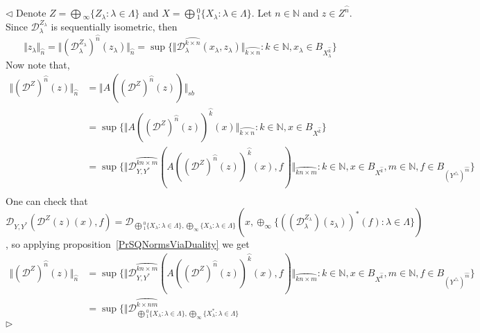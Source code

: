 \documentclass[12pt]{article}
\newenvironment{proof}{\par $\triangleleft$}{$\triangleright$}
\begin{document}
\begin{proof} Denote $Z=\bigoplus{}_\infty \{Z_\lambda:\lambda\in\Lambda \}$ and 
$X=\bigoplus{}_1^0 \{X_\lambda:\lambda\in\Lambda \}$. Let $n\in\mathbb{N}$ and 
$z\in Z^{\wideparen{n}}$. Since $\mathcal{D}_\lambda^{Z_\lambda}$ is 
sequentially isometric, then
$$
\Vert z_\lambda\Vert_{\wideparen{n}}=
\Vert
    {(\mathcal{D}_\lambda^{Z_\lambda})}^{\wideparen{n}}(z_\lambda)
\Vert_{\wideparen{n}}
=\sup \{
    \Vert 
        \mathcal{D}_\lambda^{\wideparen{k\times n}}(x_\lambda,z_\lambda)
    \Vert_{\wideparen{k\times n}}
    :k\in\mathbb{N},x_\lambda\in B_{X_\lambda^{\wideparen{k}}}
 \}
$$
Now note that,
$$
\begin{aligned}
\Vert{(\mathcal{D}^Z)}^{\wideparen{n}}(z)\Vert_{\wideparen{n}} &
=\Vert  
    A({(\mathcal{D}^Z)}^{\wideparen{n}}(z))
\Vert_{sb}\\
&=\sup \{
    \Vert
        {A({(\mathcal{D}^Z)}^{\wideparen{n}}(z))}^{\wideparen{k}}(x)
    \Vert_{\wideparen{k\times n}}
    :k\in\mathbb{N},x\in B_{X^{\wideparen{k}}}
 \} \\
&=\sup \{
    \Vert 
        \mathcal{D}_{Y,Y^*}^{\wideparen{kn\times m}}(
            {A({(\mathcal{D}^Z)}^{\wideparen{n}}(z))}^{\wideparen{k}}(x),f
        )
    \Vert_{\wideparen{kn\times m}}
    :k\in\mathbb{N},x\in B_{X^{\wideparen{k}}},m\in\mathbb{N},
    f\in B_{{(Y^\triangle)}^{\wideparen{m}}}
 \} \\
\end{aligned}
$$
One can check that 
$\mathcal{D}_{Y,Y^*}(\mathcal{D}^Z(z)(x),f)
=\mathcal{D}_{
    \bigoplus{}_1^0 \{X_\lambda:\lambda\in\Lambda \},
    \bigoplus_\infty \{X_\lambda:\lambda\in\Lambda \}
}(
    x,\oplus_\infty \{
        {((\mathcal{D}_\lambda^{Z_\lambda})(z_\lambda))}^*(f)
        :\lambda\in\Lambda
     \}
)$, 
so applying proposition~\ref{PrSQNormsViaDuality} we get
$$
\begin{aligned}
\Vert{(\mathcal{D}^Z)}^{\wideparen{n}}(z)\Vert_{\wideparen{n}} &
=\sup \{
    \Vert
        \mathcal{D}_{Y,Y^*}^{\wideparen{kn\times m}}(
            {A({(\mathcal{D}^Z)}^{\wideparen{n}}(z))}^{\wideparen{k}}(x),
        f)\Vert_{\wideparen{kn\times m}}
        :k\in\mathbb{N},x\in B_{X^{\wideparen{k}}},m\in\mathbb{N},
        f\in B_{{(Y^\triangle)}^{\wideparen{m}}}
 \} \\
&=\sup \{
    \Vert
        \mathcal{D}_{
            \bigoplus{}_1^0 \{
                X_\lambda:\lambda\in\Lambda
             \},
            \bigoplus_\infty \{
                X_\lambda^*:\lambda\in\Lambda
             \}}^{\wideparen{k\times nm}}

\end{aligned}$$
\end{proof}
\end{document}
